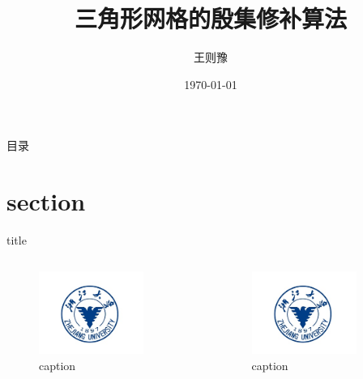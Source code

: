 \documentclass{beamer}
\title{三角形网格的殷集修补算法}
\author{王则豫}
\institute{浙江大学数学科学学院}
\date{\today}
\begin{document}
\frame{\titlepage}

\begin{frame}{目录}
    \tableofcontents
\end{frame}

\section{section}
\begin{frame}{title}
    \begin{columns}
        \begin{figure}
            \includegraphics[width=0.8\textwidth]{figure.png}
            \caption{caption}
        \end{figure}
        \begin{figure}
            \includegraphics[width=0.8\textwidth]{figure.png}
            \caption{caption}
        \end{figure}
    \end{columns}
\end{frame}
\end{document}
